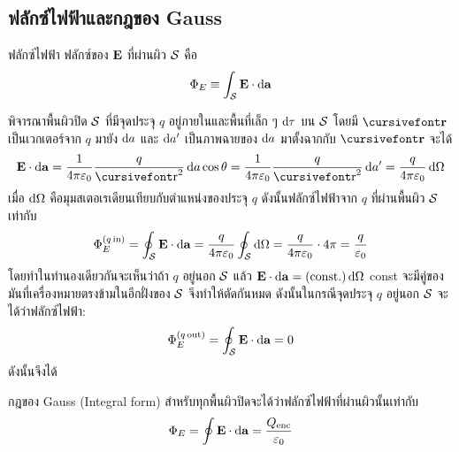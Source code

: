 \subsection{ฟลักซ์ไฟฟ้าและกฎของ Gauss}
\begin{defbox}{ฟลักซ์ไฟฟ้า}
    ฟลักซ์ของ $\mathbf{E}$ ที่ผ่านผิว $\mathcal{S}$ คือ
    \begin{equation}
        \Phi_E\equiv\int_\sur\vb{E}\cdot\odif{\vb{a}}
    \end{equation}
\end{defbox}
พิจารณาพื้นผิวปิด $\mathcal{S}$ ที่มีจุดประจุ $q$ อยู่ภายในและพื้นที่เล็ก ๆ $\odif{\tau}$ บน $\mathcal{S}$ โดยมี $\vrr$ เป็นเวกเตอร์จาก $q$ มายัง $\odif{a}$ และ $\odif{a'}$ เป็นภาพฉายของ $\odif{a}$ มาตั้งฉากกับ $\vrr$ จะได้
\[\vb{E}\cdot \odif{\vb{a}}=\kem\frac{q}{\nrr^2}\odif{a}\cos\theta=\kem\frac{q}{\nrr^2}\odif{a'}=\frac{q}{4\pi\eps_0}\odif{\Omega}\]
เมื่อ $\odif{\Omega}$ คือมุมสเตอเรเดียนเทียบกับตำแหน่งของประจุ $q$ ดังนั้นฟลักซ์ไฟฟ้าจาก $q$ ที่ผ่านพื้นผิว $\mathcal{S}$ เท่ากับ
\begin{equation}
\Phi_E^{(q\,\txt{in})}=\oint_\sur\vb{E}\cdot\odif{\vb{a}}=\frac{q}{4\pi\eps_0}\oint_\sur\odif{\Omega}=\frac{q}{4\pi\eps_0}\cdot4\pi=\frac{q}{\eps_0}
\end{equation}
โดยทำในทำนองเดียวกันจะเห็นว่าถ้า $q$ อยู่นอก $\mathcal{S}$ แล้ว $\vb{E}\cdot\odif{\vb{a}}=(\cst)\odif{\Omega}$ const จะมีคู่ของมันที่เครื่องหมายตรงข้ามในอีกฝั่งของ $\mathcal{S}$ จึงทำให้ตัดกันหมด ดังนั้นในกรณีจุดประจุ $q$ อยู่นอก $\mathcal{S}$ จะได้ว่าฟลักซ์ไฟฟ้า:
\begin{equation}
\Phi_E^{(q\,\txt{out})}=\oint_\sur\vb{E}\cdot\odif{\vb{a}}=0
\end{equation}
ดังนั้นจึงได้
\begin{lawbox}{กฎของ Gauss (Integral form)}
    สำหรับทุกพื้นผิวปิดจะได้ว่าฟลักซ์ไฟฟ้าที่ผ่านผิวนั้นเท่ากับ
    \begin{equation}
        \Phi_E=\oint\vb{E}\cdot\odif{\vb{a}}=\frac{Q_\txt{enc}}{\eps_0}\label{gauss}
    \end{equation}
\end{lawbox}

